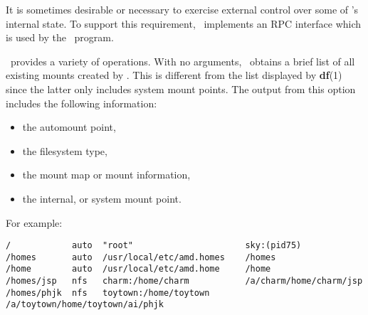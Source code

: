 %
%
%
%


\label{chapter:amq}

It is sometimes desirable or necessary to exercise external control
over some of \amd's internal state.  To support this requirement,
\amd\ implements an RPC interface which is used by the \amq\ program.

\Amq\ provides a variety of operations.  With no arguments, \amq\ obtains
a brief list of all existing mounts created by \amd.  This is different from
the list displayed by {\bf df}(1) since the latter only includes system
mount points.
The output from this option includes the following information:
\begin{itemize}
\item the automount point,
\item the filesystem type,
\item the mount map or mount information,
\item the internal, or system mount point.
\end{itemize}
For example:
\begin{verbatim}
/            auto  "root"                      sky:(pid75)
/homes       auto  /usr/local/etc/amd.homes    /homes
/home        auto  /usr/local/etc/amd.home     /home
/homes/jsp   nfs   charm:/home/charm           /a/charm/home/charm/jsp
/homes/phjk  nfs   toytown:/home/toytown       /a/toytown/home/toytown/ai/phjk
\end{verbatim}

